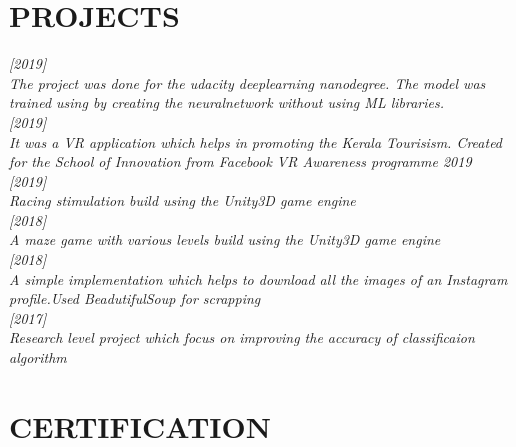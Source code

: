 \documentclass[margin]{res}
\begin{document}
\begin{resume}
\section{PROJECTS} 

    \sl \normalfont {} \hfill [2019] \\ 
     The project was done for the udacity deeplearning nanodegree. The model was trained using by creating the neuralnetwork without using ML libraries.
     \\   
    \normalfont {} \hfill [2019]\\ 
     It was a VR application which helps in promoting the Kerala Tourisism. Created for the  School of Innovation from Facebook VR Awareness programme 2019 
     \\     \normalfont {} \hfill [2019] \\ 
     Racing stimulation build using the Unity3D game engine
     \\     \normalfont {} \hfill [2018] \\ 
     A maze game with various levels build using the Unity3D game engine
     \\    \normalfont {} \hfill [2018]\\
     A simple implementation which helps to download all the images of an Instagram profile.Used BeadutifulSoup for scrapping\\
    \normalfont {} \hfill [2017] \\ Research level project which focus on improving the accuracy of classificaion algorithm



\section{CERTIFICATION}
   

\end{resume}
\end{document}
